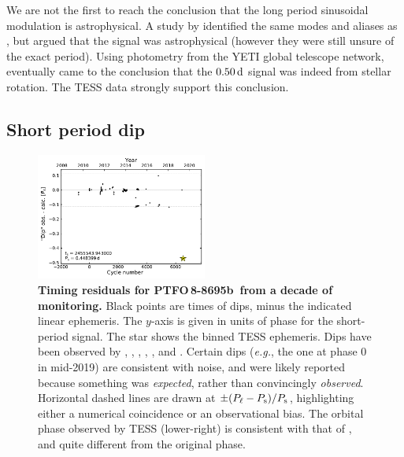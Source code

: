 \documentclass[12pt,twocolumn,tighten]{aastex62}
\newcommand{\ptfob}{PTFO$\,$8-8695b}
\begin{document}
We are not the first to reach the conclusion that the long period
sinusoidal modulation is astrophysical.  A study by
\citet{koen_multicolour_2015} identified the same modes and aliases as
\citet{van_eyken_ptf_2012}, but argued that the signal was
astrophysical (however they were still unsure of the exact period).
Using photometry from the YETI global telescope network,
\citet{raetz_yeti_2016} eventually came to the conclusion that the
$0.50\,{\rm d}$ signal was indeed from stellar rotation.  The TESS
data strongly support this conclusion.



\subsection{Short period dip}

\begin{figure}[t]
	\begin{center}
		\leavevmode
		\includegraphics[width=0.5\textwidth]{f6.pdf}
	\end{center}
	\vspace{-0.7cm}
	\caption{
		{\bf Timing residuals for \ptfob\ from a decade of monitoring.}
		Black points are times of dips, minus the indicated linear
		ephemeris.  The $y$-axis is given in units of phase for the
		short-period signal.  The star shows the binned TESS ephemeris.
		Dips have been observed by \citet{van_eyken_ptf_2012},
		\citet{ciardi_followup_2015}, \citet{yu_tests_2015},
		\citet{raetz_yeti_2016}, \citet{onitsuka_multicolor_2017}, and
		\citet{tanimoto_evidence_2020}.  Certain dips ({\it e.g.}, the one
		at phase 0 in mid-2019) are consistent with noise, and were likely
		reported because something was {\it expected}, rather than
		convincingly {\it observed}.  Horizontal dashed lines are drawn at
		$\pm (P_{\rm \ell} - P_{\rm s})/P_{\rm s}$, highlighting either a
		numerical coincidence or an observational bias.  The orbital phase
		observed by TESS (lower-right) is consistent with that of
		\citet{tanimoto_evidence_2020}, and quite different from the
		original phase.
		\label{fig:o_minus_c}
	}
\end{figure}
\end{document}
